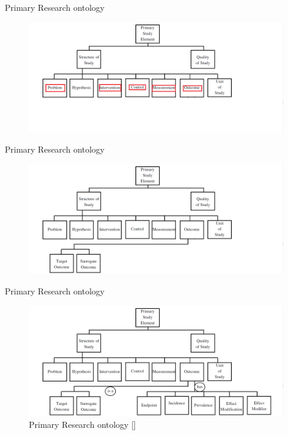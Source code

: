 \documentclass[16:9,en,navbarside]{sdqbeamer}
\begin{document}
\begin{frame}{Primary Research ontology}
    \begin{figure}
		\includegraphics[width=12cm]{images/SROnt3.5.PNG}
	\end{figure}
\end{frame}

\begin{frame}{Primary Research ontology}
    \begin{figure}
		\includegraphics[width=12cm]{images/SROnt4.PNG}
	\end{figure}
\end{frame}

\begin{frame}{Primary Research ontology}
    \begin{figure}
		\includegraphics[width=12cm]{images/SROnt5.PNG}
		\caption{Primary Research ontology [\cite{Bio07}]}
	\end{figure}
\end{frame}
\end{document}
